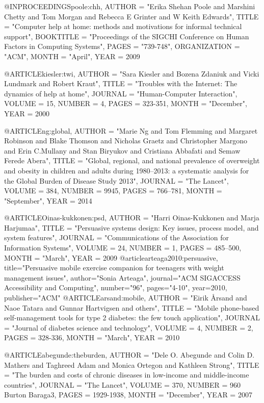 @INPROCEEDINGS{poole:chh,
	AUTHOR = "Erika Shehan Poole and Marshini Chetty and Tom Morgan and Rebecca E Grinter and W Keith Edwards",
	TITLE = "Computer help at home: methods and motivations for informal technical support",
	BOOKTITLE = "Proceedings of the SIGCHI Conference on Human Factors in Computing Systems",
	PAGES = "739-748",
	ORGANIZATION = "ACM",
	MONTH = "April", 
	YEAR = {2009}	}

@ARTICLE{kiesler:twi,
	AUTHOR = "Sara Kiesler and Bozena Zdaniuk and Vicki Lundmark and Robert Kraut",
	TITLE = "Troubles with the Internet: The dynamics of help at home",
	JOURNAL = "Human-Computer Interaction",
	VOLUME = {15},
	NUMBER = {4},
	PAGES = {323-351},
	MONTH = "December",
	YEAR = {2000}	}

@ARTICLE{ng:global,
	AUTHOR = "Marie Ng and Tom Flemming and Margaret Robinson and Blake Thomson and Nicholas Graetz and Christopher Margono and  Erin C.Mullany and Stan Biryukov and Cristiana Abbafati and Semaw Ferede Abera",
	TITLE = "Global, regional, and national prevalence of overweight and obesity in children and adults during 1980--2013: a systematic analysis for the Global Burden of Disease Study 2013",
	JOURNAL = "The Lancet",
	VOLUME = {384},
	NUMBER = {9945},
	PAGES = {766--781},
	MONTH = "September",
	YEAR = {2014}	}

@ARTICLE{Oinas-kukkonen:psd,
	AUTHOR = "Harri Oinas-Kukkonen and Marja Harjumaa",
	TITLE = "Persuasive systems design: Key issues, process model, and system features",
	JOURNAL = "Communications of the Association for Information Systems",
	VOLUME = {24},
	NUMBER = {1},
	PAGES = {485–500},
	MONTH = "March",
	YEAR = {2009}	}
@article{arteaga2010:persuasive,
  title="Persuasive mobile exercise companion for teenagers with weight management issues",
  author="Sonia Arteaga",
  journal="ACM SIGACCESS Accessibility and Computing",
  number="96",
  pages="4-10",
  year={2010},
  publisher="ACM"
}
@ARTICLE{arsand:mobile,
	AUTHOR = "Eirik {\AA}rsand  and Naoe Tatara and Gunnar Hartvigsen  and others",
	TITLE = "Mobile phone-based self-management tools for type 2 diabetes: the few touch application",
	JOURNAL = "Journal of diabetes science and technology",
	VOLUME = {4},
	NUMBER = {2},
	PAGES = {328-336},
	MONTH = "March",
	YEAR = {2010}	}

@ARTICLE{abegunde:theburden,
	AUTHOR = "Dele O. Abegunde and Colin D. Mathers and Taghreed Adam and Monica Ortegon and Kathleen Strong",
	TITLE = "The burden and costs of chronic diseases in low-income and middle-income countries",
	JOURNAL = "The Lancet",
	VOLUME = {370},
	NUMBER = {960 Burton Baraga3},
	PAGES = {1929-1938},
	MONTH = "December",
	YEAR = {2007}	}

